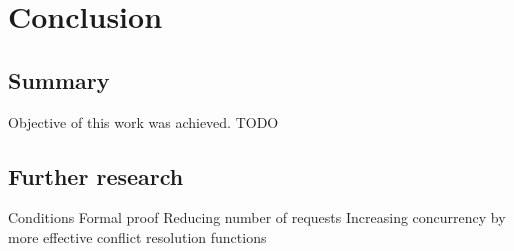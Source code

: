 
\chapter{Conclusion}\label{chapter:summary}

\section{Summary}
Objective of this work was achieved. TODO

\section{Further research}
Conditions
Formal proof
Reducing number of requests
Increasing concurrency by more effective conflict resolution functions


